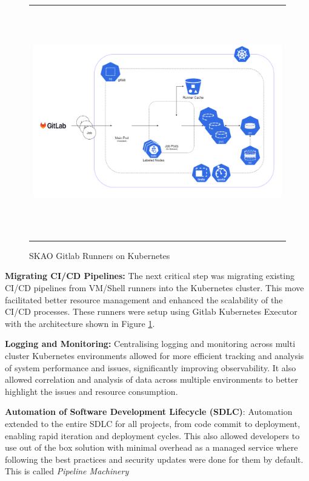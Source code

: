 \documentclass[a4paper]{spie}  %
\begin{document}
   \begin{figure} [ht]
   \begin{center}
   \begin{tabular}{c} %
   \includegraphics[height=10cm]{gitlab-runners.png}
   \end{tabular}
   \end{center}
   \caption 
   { \label{fig:runners}
SKAO Gitlab Runners on Kubernetes}
    \end{figure} 

\noindent\textbf{Migrating CI/CD Pipelines:} The next critical step was migrating existing CI/CD pipelines from VM/Shell runners into the Kubernetes cluster. This move facilitated better resource management and enhanced the scalability of the CI/CD processes. These runners were setup using Gitlab Kubernetes Executor with the architecture shown in Figure \ref{fig:runners}. 

\noindent\textbf{Logging and Monitoring:} Centralising logging and monitoring across multi cluster Kubernetes environments allowed for more efficient tracking and analysis of system performance and issues, significantly improving observability. It also allowed correlation and analysis of data across multiple environments to better highlight the issues and resource consumption.

\noindent\textbf{Automation of Software Development Lifecycle (SDLC)}: Automation extended to the entire SDLC for all projects, from code commit to deployment, enabling rapid iteration and deployment cycles. This also allowed developers to use out of the box solution with minimal overhead as a managed service where following the best practices and security updates were done for them by default. This is called \textit{Pipeline Machinery}\cite{team_skao_2024}
\end{document}
